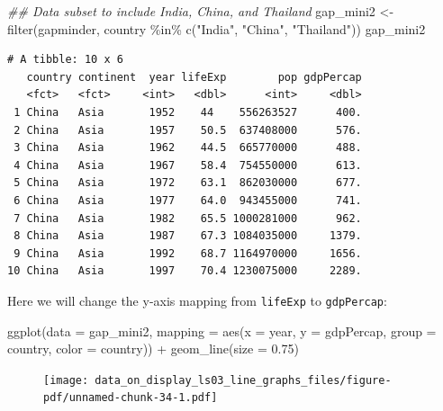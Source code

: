 \documentclass[
  letterpaper,
  DIV=11,
  numbers=noendperiod]{scrreprt}
\newenvironment{Shaded}{\begin{snugshade}}{\end{snugshade}}
\newcommand{\AttributeTok}[1]{\textcolor[rgb]{0.40,0.45,0.13}{#1}}
\newcommand{\DocumentationTok}[1]{\textcolor[rgb]{0.37,0.37,0.37}{\textit{#1}}}
\newcommand{\FloatTok}[1]{\textcolor[rgb]{0.68,0.00,0.00}{#1}}
\newcommand{\FunctionTok}[1]{\textcolor[rgb]{0.28,0.35,0.67}{#1}}
\newcommand{\NormalTok}[1]{\textcolor[rgb]{0.00,0.23,0.31}{#1}}
\newcommand{\OtherTok}[1]{\textcolor[rgb]{0.00,0.23,0.31}{#1}}
\newcommand{\SpecialCharTok}[1]{\textcolor[rgb]{0.37,0.37,0.37}{#1}}
\newcommand{\StringTok}[1]{\textcolor[rgb]{0.13,0.47,0.30}{#1}}
\begin{document}
\begin{Shaded}
\begin{Highlighting}[]
\DocumentationTok{\#\# Data subset to include India, China, and Thailand}
\NormalTok{gap\_mini2 }\OtherTok{\textless{}{-}} \FunctionTok{filter}\NormalTok{(gapminder,}
\NormalTok{                    country }\SpecialCharTok{\%in\%} \FunctionTok{c}\NormalTok{(}\StringTok{"India"}\NormalTok{,}
                                   \StringTok{"China"}\NormalTok{,}
                                   \StringTok{"Thailand"}\NormalTok{))}
\NormalTok{gap\_mini2}
\end{Highlighting}
\end{Shaded}

\begin{verbatim}
# A tibble: 10 x 6
   country continent  year lifeExp        pop gdpPercap
   <fct>   <fct>     <int>   <dbl>      <int>     <dbl>
 1 China   Asia       1952    44    556263527      400.
 2 China   Asia       1957    50.5  637408000      576.
 3 China   Asia       1962    44.5  665770000      488.
 4 China   Asia       1967    58.4  754550000      613.
 5 China   Asia       1972    63.1  862030000      677.
 6 China   Asia       1977    64.0  943455000      741.
 7 China   Asia       1982    65.5 1000281000      962.
 8 China   Asia       1987    67.3 1084035000     1379.
 9 China   Asia       1992    68.7 1164970000     1656.
10 China   Asia       1997    70.4 1230075000     2289.
\end{verbatim}

Here we will change the y-axis mapping from \texttt{lifeExp} to
\texttt{gdpPercap}:

\begin{Shaded}
\begin{Highlighting}[]
\FunctionTok{ggplot}\NormalTok{(}\AttributeTok{data =}\NormalTok{ gap\_mini2, }
       \AttributeTok{mapping =} \FunctionTok{aes}\NormalTok{(}\AttributeTok{x =}\NormalTok{ year, }
                     \AttributeTok{y =}\NormalTok{ gdpPercap, }
                     \AttributeTok{group =}\NormalTok{ country, }
                     \AttributeTok{color =}\NormalTok{ country)) }\SpecialCharTok{+}
  \FunctionTok{geom\_line}\NormalTok{(}\AttributeTok{size =} \FloatTok{0.75}\NormalTok{)}
\end{Highlighting}
\end{Shaded}

\begin{figure}[H]

{\centering \texttt{[image: data\_on\_display\_ls03\_line\_graphs\_files/figure-pdf/unnamed-chunk-34-1.pdf]}

}

\end{figure}
\end{document}
